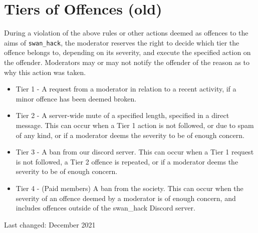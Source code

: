 \documentclass[12pt]{extarticle}
\begin{document}
	\section{Tiers of Offences (old)}
	During a violation of the above rules or other actions deemed as offences to the aims of \texttt{swan\_hack}, the moderator reserves the right to decide which tier the offence belongs to, depending on its severity, and execute the specified action on the offender. Moderators may or may not notify the offender of the reason as to why this action was taken.
    \begin{itemize}
        \item Tier 1 - A request from a moderator in relation to a recent activity, if a minor offence has been deemed broken.
	    \item Tier 2 - A server-wide mute of a specified length, specified in a direct message. This can occur when a Tier 1 action is not followed, or due to spam of any kind, or if a moderator deems the severity to be of enough concern.
	    \item Tier 3 - A ban from our discord server. This can occur when a Tier 1 request is not followed, a Tier 2 offence is repeated, or if a moderator deems the severity to be of enough concern. 
	    \item Tier 4 - (Paid members) A ban from the society. This can occur when the severity of an offence deemed by a moderator is of enough concern, and includes offences outside of the swan\_hack Discord server.
	\end{itemize}
	
	\footnotesize Last changed: December 2021 
\end{document}
